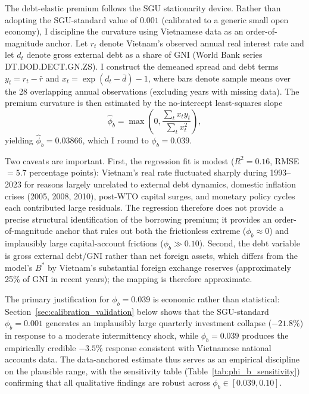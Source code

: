 \documentclass[12pt, a4paper]{article}
\begin{document}
	The debt-elastic premium follows the SGU stationarity device. Rather than adopting the SGU-standard value of $0.001$ (calibrated to a generic small open economy), I discipline the curvature using Vietnamese data as an order-of-magnitude anchor. Let $r_t$ denote Vietnam's observed annual real interest rate \citep{worldbank2024} and let $d_t$ denote gross external debt as a share of GNI (World Bank series DT.DOD.DECT.GN.ZS). I construct the demeaned spread and debt terms $y_t = r_t - \bar{r}$ and $x_t = \exp(d_t - \bar{d}) - 1$, where bars denote sample means over the 28 overlapping annual observations (excluding years with missing data). The premium curvature is then estimated by the no-intercept least-squares slope
	\[
	\hat{\phi}_b = \max\!\left(0, \frac{\sum_t x_t y_t}{\sum_t x_t^2}\right),
	\]
	yielding $\hat{\phi}_b = 0.03866$, which I round to $\phi_b = 0.039$.

	Two caveats are important. First, the regression fit is modest ($R^2 = 0.16$, RMSE $= 5.7$ percentage points): Vietnam's real rate fluctuated sharply during 1993--2023 for reasons largely unrelated to external debt dynamics, domestic inflation crises (2005, 2008, 2010), post-WTO capital surges, and monetary policy cycles each contributed large residuals. The regression therefore does not provide a precise structural identification of the borrowing premium; it provides an order-of-magnitude anchor that rules out both the frictionless extreme ($\phi_b \approx 0$) and implausibly large capital-account frictions ($\phi_b \gg 0.10$). Second, the debt variable is gross external debt/GNI rather than net foreign assets, which differs from the model's $B^*$ by Vietnam's substantial foreign exchange reserves (approximately 25\% of GNI in recent years); the mapping is therefore approximate.

	The primary justification for $\phi_b = 0.039$ is economic rather than statistical: Section~\ref{sec:calibration_validation} below shows that the SGU-standard $\phi_b = 0.001$ generates an implausibly large quarterly investment collapse ($-21.8\%$) in response to a moderate intermittency shock, while $\phi_b = 0.039$ produces the empirically credible $-3.5\%$ response consistent with Vietnamese national accounts data. The data-anchored estimate thus serves as an empirical discipline on the plausible range, with the sensitivity table (Table~\ref{tab:phi_b_sensitivity}) confirming that all qualitative findings are robust across $\phi_b \in [0.039, 0.10]$.
	
\end{document}

